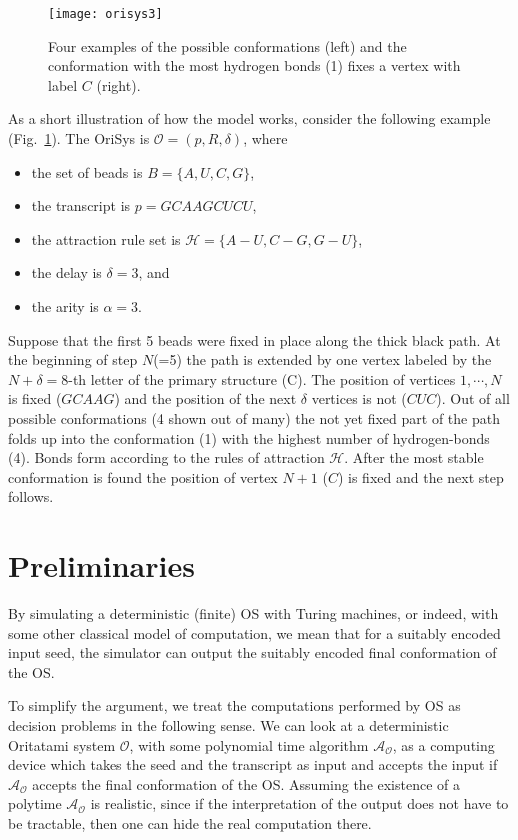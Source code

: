 \documentclass[]{llncs}
\newcommand{\ori}{\mathcal{O}}
\newcommand{\bond}{\mathcal{H}}
\begin{document}
\begin{figure}
\centering
\texttt{[image: orisys3]}
\caption{Four examples of the possible conformations (left) and the conformation with the most hydrogen bonds (1) fixes a vertex with label $C$ (right).}
\label{fig:orisys3}
\end{figure}

As a short illustration of how the model works, consider the following example (Fig.~\ref{fig:orisys3}). The OriSys is $\ori= (p, R, \delta)$, where

\begin{itemize}
\item the set of beads is $B=\{A, U, C, G\}$,
\item the transcript is $p=GCAAGCUCU$,
\item the attraction rule set is $\bond = \{A-U, C-G, G-U  \}$,
\item the delay is $\delta = 3$, and
\item the arity is $\alpha=3$.
\end{itemize}


 Suppose that the first 5 beads were fixed in place along the thick black path. At the beginning of step $N$(=5) the path is extended by one vertex labeled by the $N+\delta=8$-th letter of the primary structure (C). The position of vertices $1,\cdots, N$ is fixed ($GCAAG$) and the position of the next $\delta$ vertices is not ($CUC$). Out of all possible conformations (4 shown out of many) the not yet fixed part of the path folds up into the conformation (1) with the highest number of hydrogen-bonds (4). Bonds form according to the rules of attraction $\bond$. After the most stable conformation is found the position of vertex $N+1$ ($C$) is fixed and the next step follows.


\section{Preliminaries}
By simulating a deterministic (finite) OS with Turing machines, or indeed, with some other classical model of computation, we mean that for a suitably encoded input seed, the simulator can output the suitably encoded final conformation of the OS.

To simplify the argument, we treat the computations performed by OS as decision problems in the following sense. We can look at a deterministic Oritatami system $\ori$, with some polynomial time algorithm $\mathcal{A}_\ori$, as a computing device which takes the seed and the transcript as input and accepts the input if $\mathcal{A}_\ori$ accepts the final conformation of the OS. Assuming the existence of a polytime $\mathcal{A}_\ori$ is realistic, since if the interpretation of the output does not have to be tractable, then one can hide the real computation there.
\end{document}
